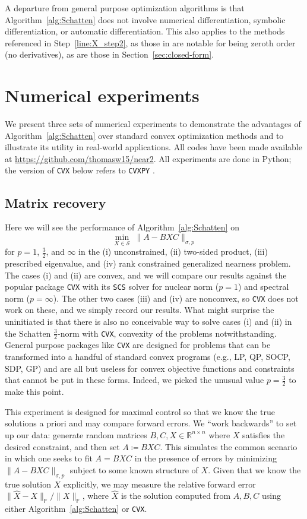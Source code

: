 \documentclass[11pt,reqno]{amsart}
\newcommand{\st}{\sigma}
\newcommand{\F}{{\scriptscriptstyle\mathsf{F}}}
\theoremstyle{definition}
\numberwithin{equation}{section}
\newcommand{\R}{\mathbb{R}}
\begin{document}
A departure from general purpose optimization algorithms is that Algorithm~\ref{alg:Schatten} does not involve numerical differentiation, symbolic differentiation, or automatic differentiation. This also applies to the methods referenced in Step~\ref{line:X_step2}, as those in \cite{li22} are notable for being zeroth order (no derivatives), as are those in Section~\ref{sec:closed-form}.

\section{Numerical experiments}\label{sec:experiments}

We present three sets of numerical experiments to demonstrate the advantages of Algorithm~\ref{alg:Schatten} over standard convex optimization methods and to  illustrate its utility in real-world applications. All codes have been made available at \url{https://github.com/thomasw15/near2}. All experiments are done in Python; the version of \texttt{CVX} below refers to \texttt{CVXPY} \cite{cvx}.

\subsection{Matrix recovery}

Here we will see the performance of Algorithm~\ref{alg:Schatten} on
\[
\min_{X \in \mathcal{S} } \; \lVert A - BXC \rVert_{\st,p}
\] 
for $p=1$, $\frac32$, and $\infty$ in the (i) unconstrained, (ii) two-sided product, (iii) prescribed eigenvalue, and (iv) rank constrained generalized nearness problem. The cases (i) and (ii)  are convex, and we will compare our results against the popular package \texttt{CVX}  with its \texttt{SCS} solver \cite{SCS} for nuclear norm ($p=1$) and spectral norm ($p=\infty$). The other two cases (iii) and (iv) are nonconvex, so \texttt{CVX} does not work on these, and we simply record our results. What might surprise the uninitiated is that there is also no conceivable way to solve cases (i) and (ii) in the Schatten $\frac32$-norm with \texttt{CVX}, convexity of the problems notwithstanding. General purpose packages like \texttt{CVX} are designed for problems that can be transformed into a handful of standard convex programs (e.g., LP, QP, SOCP, SDP, GP) and are all but useless for convex objective functions and constraints that cannot be put in these forms. Indeed, we picked the unusual value $p = \frac32$ to make this point.

This experiment is designed for maximal control so that we know the true solutions a priori and may compare forward errors. We ``work backwards'' to set up our data:  generate random matrices $B, C, X \in \R^{n \times n}$ where $X$ satisfies the desired constraint, and then set $A \coloneqq BXC$. This simulates the common scenario in which one seeks to fit $A = BXC$ in the presence of errors by minimizing $\lVert A - BXC \rVert_{\st,p}$ subject to some known structure of $X$. Given that we know the true solution $X$ explicitly, we may measure the relative forward error $\lVert \widehat{X} - X \rVert_\F /\lVert X \rVert_\F$, where $\widehat{X}$ is the solution computed from $A,B,C$ using either Algorithm~\ref{alg:Schatten} or \texttt{CVX}.
\end{document}
